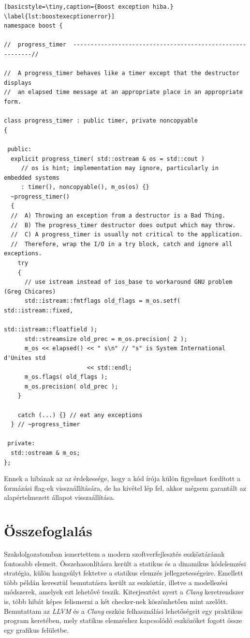 \documentclass[a4paper,12pt]{report}
\begin{document}
\begin{minipage}{\linewidth}
\begin{lstlisting}[basicstyle=\tiny,caption={Boost exception hiba.}
\label{lst:boostexecptionerror}]
namespace boost {

//  progress_timer  ----------------------------------------------------------//

//  A progress_timer behaves like a timer except that the destructor displays
//  an elapsed time message at an appropriate place in an appropriate form.

class progress_timer : public timer, private noncopyable
{

 public:
  explicit progress_timer( std::ostream & os = std::cout )
     // os is hint; implementation may ignore, particularly in embedded systems
     : timer(), noncopyable(), m_os(os) {}
  ~progress_timer()
  {
  //  A) Throwing an exception from a destructor is a Bad Thing.
  //  B) The progress_timer destructor does output which may throw.
  //  C) A progress_timer is usually not critical to the application.
  //  Therefore, wrap the I/O in a try block, catch and ignore all exceptions.
    try
    {
      // use istream instead of ios_base to workaround GNU problem (Greg Chicares)
      std::istream::fmtflags old_flags = m_os.setf( std::istream::fixed,
                                                   std::istream::floatfield );
      std::streamsize old_prec = m_os.precision( 2 );
      m_os << elapsed() << " s\n" // "s" is System International d'Unites std
                        << std::endl;
      m_os.flags( old_flags );
      m_os.precision( old_prec );
    }

    catch (...) {} // eat any exceptions
  } // ~progress_timer

 private:
  std::ostream & m_os;
}; 
\end{lstlisting}
\end{minipage}

Ennek a hibának az az érdekessége, hogy a kód írója külön figyelmet fordított a formázási flag-ek visszaállítására, de ha kivétel lép fel, akkor mégsem garantált az alapértelmezett állapot visszaállítása.

\chapter{Összefoglalás}
Szakdolgozatomban ismertettem a modern szoftverfejlesztés eszköztárának fontosabb elemeit. Összehasonlításra került a statikus és a dinamikus kódelemzési stratégia, külön hangsúlyt fektetve a statikus elemzés jellegzetességeire. Emellett több példán keresztül bemutatásra került az eszköztár, illetve a modellezési módszerek, amelyek ezt lehetővé teszik. Kiterjesztést nyert a \emph{Clang} keretrendszer is, több hibát képes felismerni a két checker-nek köszönhetően mint azelőtt. Bemutattam az \emph{LLVM} és a \emph{Clang} eszköz felhasználási lehetőségeit egy praktikus program keretében, mely statikus elemzéshez kapcsolódó eszközöket fogott össze egy grafikus felületbe.
\end{document}

